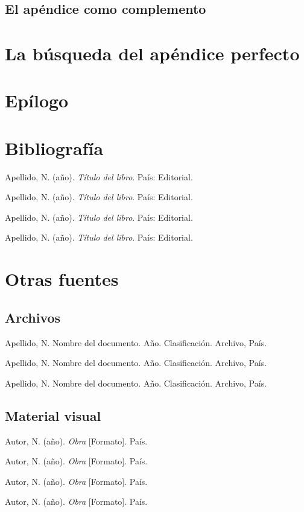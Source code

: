 \documentclass[12pt,c5paper,oneside]{book} %
\begin{document}
\lipsum[1-10]

\section{El apéndice como complemento}

\lipsum[2-3]

\clearpage{\pagestyle{empty}\cleardoublepage}

\chapter{La búsqueda del apéndice perfecto}

\lipsum[1-6]

\backmatter

\chapter{Epílogo}

\lipsum[1-6]

\chapter{Bibliografía}

Apellido, N. (año). \emph{Título del libro}. País: Editorial.

Apellido, N. (año). \emph{Título del libro}. País: Editorial.

Apellido, N. (año). \emph{Título del libro}. País: Editorial.

Apellido, N. (año). \emph{Título del libro}. País: Editorial.

\clearpage{\pagestyle{empty}\cleardoublepage}

\chapter{Otras fuentes}
\section{Archivos}

Apellido, N. Nombre del documento. Año. Clasificación. Archivo, País.

Apellido, N. Nombre del documento. Año. Clasificación. Archivo, País.

Apellido, N. Nombre del documento. Año. Clasificación. Archivo, País.

\section{Material visual}

Autor, N. (año). \emph{Obra} [Formato]. País.

Autor, N. (año). \emph{Obra} [Formato]. País.

Autor, N. (año). \emph{Obra} [Formato]. País.

Autor, N. (año). \emph{Obra} [Formato]. País.
\end{document}
